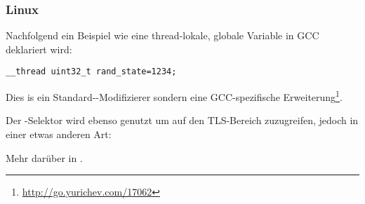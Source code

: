 \subsubsection{Linux}

Nachfolgend ein Beispiel wie eine thread-lokale, globale Variable in GCC deklariert wird:

\begin{lstlisting}
__thread uint32_t rand_state=1234;
\end{lstlisting}

Dies is ein Standard-\CCpp-Modifizierer sondern eine GCC-spezifische Erweiterung\footnote{\url{http://go.yurichev.com/17062}}.


Der -Selektor wird ebenso genutzt um auf den \ac{TLS}-Bereich zuzugreifen,
jedoch in einer etwas anderen Art:




Mehr darüber in \DrepperTLS.
